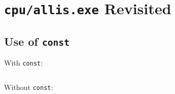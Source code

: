 \documentclass[main]{subfiles}
\begin{document}
\section{\texttt{cpu/allis.exe} Revisited}
\subsection{Use of \texttt{const}}
With \texttt{const}: \\
\begin{lstlisting}
\end{lstlisting}

Without \texttt{const}: \\
\end{document}
